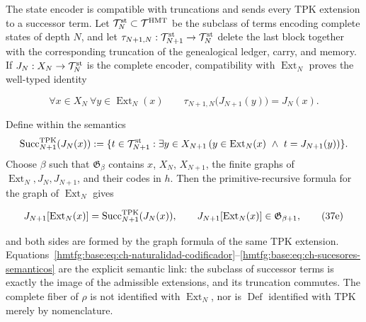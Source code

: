 The state encoder is compatible with truncations and sends every TPK extension
to a successor term. Let
\(\mathcal T_N^{\rm st}\subset\mathcal T^{\rm HMT}\) be the subclass of terms
encoding complete states of depth \(N\), and let
\(\tau_{N+1,N}:\mathcal T_{N+1}^{\rm st}\to\mathcal T_N^{\rm st}\) delete the
last block together with the corresponding truncation of the genealogical
ledger, carry, and memory. If \(J_N:X_N\to\mathcal T_N^{\rm st}\) is the
complete encoder, compatibility with \(\operatorname{Ext}_N\) proves the
well-typed identity

\[
 \forall x\in X_N\ \forall y\in\operatorname{Ext}_N(x)\qquad
 \tau_{N+1,N}\bigl(J_{N+1}(y)\bigr)=J_N(x).
\tag{37e$_0$}\label{hmtfg:base:eq:ch-naturalidad-codificador}
\]

Define within the semantics
\[
 \operatorname{Succ}^{\rm TPK}_{N+1}(J_N(x)):=
 \{t\in\mathcal T_{N+1}^{\rm st}:\exists y\in X_{N+1}\,
   (y\in\operatorname{Ext}_N(x)\ \wedge\ t=J_{N+1}(y))\}.
\]
Choose \(\beta\) such that \(\mathfrak G_\beta\) contains \(x\), \(X_N\),
\(X_{N+1}\), the finite graphs of
\(\operatorname{Ext}_N,J_N,J_{N+1}\), and their codes in \(h\). Then the
primitive-recursive formula for the graph of \(\operatorname{Ext}_N\) gives

\[
 J_{N+1}[\operatorname{Ext}_N(x)]
 =\operatorname{Succ}^{\rm TPK}_{N+1}(J_N(x)),
 \qquad
 J_{N+1}[\operatorname{Ext}_N(x)]
 \in\mathfrak G_{\beta+1},
\tag{37e}\label{hmtfg:base:eq:ch-sucesores-semanticos}
\]

and both sides are formed by the graph formula of the same TPK extension.
Equations~\eqref{hmtfg:base:eq:ch-naturalidad-codificador}--\eqref{hmtfg:base:eq:ch-sucesores-semanticos}
are the explicit semantic link: the subclass of successor terms is exactly the
image of the admissible extensions, and its truncation commutes. The complete
fiber of \(\rho\) is not identified with \(\operatorname{Ext}_N\), nor is
\(\operatorname{Def}\) identified with TPK merely by nomenclature.

